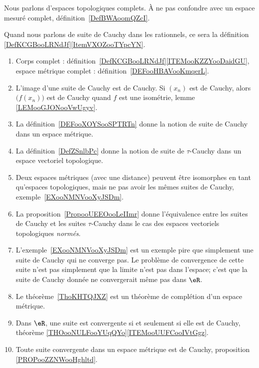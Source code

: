      \label{THMooOCXTooWenIJE}

Nous parlons d'espaces topologiques complets. À ne pas confondre avec un espace mesuré complet, définition~\ref{DefBWAoomQZcI}.

Quand nous parlons de suite de Cauchy dans les rationnels, ce sera la définition \ref{DefKCGBooLRNdJf}\ref{ItemVXOZooTYpcYN}.


\begin{enumerate}
	\item
	      Corps complet : définition~\ref{DefKCGBooLRNdJf}\ref{ITEMooKZZYooDaidGU}, espace métrique complet : définition~\ref{DEFooHBAVooKmqerL}.
	\item
	      L'image d'une suite de Cauchy est de Cauchy. Si \( (x_n)\) est de Cauchy, alors \( \big( f(x_n) \big)\) est de Cauchy quand \( f\) est une isométrie, lemme \ref{LEMooGJONooVwUgyv}.
	\item
	      La définition~\ref{DEFooXOYSooSPTRTn} donne la notion de suite de Cauchy dans un espace métrique.
	\item
	      La définition~\ref{DefZSnlbPc} donne la notion de suite de \( \tau\)-Cauchy dans un espace vectoriel topologique.
	\item
	      Deux espaces métriques (avec une distance) peuvent être isomorphes en tant qu'espaces topologiques, mais ne pas avoir les mêmes suites de Cauchy, exemple~\ref{EXooNMNVooXyJSDm}.
	\item
	      La proposition~\ref{PropooUEEOooLeIImr} donne l'équivalence entre les suites de Cauchy et les suites \( \tau\)-Cauchy dans le cas des espaces vectoriels topologiques \emph{normés}.
	\item
	      L'exemple~\ref{EXooNMNVooXyJSDm} est un exemple pire que simplement une suite de Cauchy qui ne converge pas. Le problème de convergence de cette suite n'est pas simplement que la limite n'est pas dans l'espace; c'est que la suite de Cauchy donnée ne convergerait même pas dans \( \eR\).
	\item
	      Le théorème~\ref{ThoKHTQJXZ} est un théorème de complétion d'un espace métrique.
	\item
	      Dans \( \eR\), une suite est convergente si et seulement si elle est de Cauchy, théorème \ref{THOooNULFooYUqQYo}\ref{ITEMooUUFCooIVtGgz}.
	\item
	      Toute suite convergente dans un espace métrique est de Cauchy, proposition \ref{PROPooZZNWooHghltd}.
\end{enumerate}

